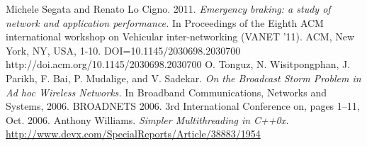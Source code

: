 \documentclass[twocolumn]{article}
\begin{document}
\begin{thebibliography}{9}
     Michele Segata and Renato Lo Cigno. 2011. {\it Emergency braking: a study of network and application performance.} In Proceedings of the Eighth ACM international workshop on Vehicular inter-networking (VANET '11). ACM, New York, NY, USA, 1-10. DOI=10.1145/2030698.2030700 http://doi.acm.org/10.1145/2030698.2030700
     O. Tonguz, N. Wisitpongphan, J. Parikh, F. Bai, P. Mudalige, and V. Sadekar. {\it On the Broadcast Storm Problem in Ad hoc Wireless Networks.} In Broadband Communications, Networks and Systems, 2006. BROADNETS 2006. 3rd International Conference on, pages 1–11, Oct. 2006.
     Anthony Williams. {\it Simpler Multithreading in C++0x.} \url{http://www.devx.com/SpecialReports/Article/38883/1954}
\end{thebibliography}
\end{document}
